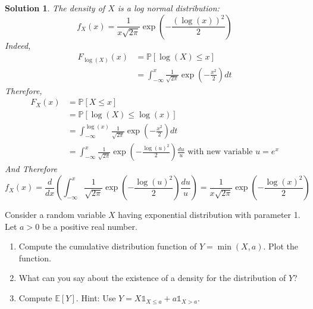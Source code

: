 \documentclass{article}
\newcommand{\proba}[1]{\mathbb{P}[#1]}
\newtheorem{solution}{Solution}
\begin{document}
\begin{solution}
  The density of $X$ is a log normal distribution:
  \[
    f_{X}(x) = \frac{1}{x\sqrt{2\pi}} \exp{\left( -\frac{{(\log(x))}^2}{2} \right)}
  \]
  Indeed,
  \begin{align*}
    F_{\log(X)}(x) & = \proba{\log(X) \leq x}                                                        \\
                   & = \int_{-\infty}^x \frac{1}{\sqrt{2\pi}} \exp{\left( -\frac{x^2}{2} \right)} dt
  \end{align*}
  Therefore,
  \begin{align*}
    F_{X}(x) & = \proba{X \leq x}                                                                                                                     \\
             & = \proba{\log(X) \leq \log(x)}                                                                                                         \\
             & = \int_{-\infty}^{\log(x)} \frac{1}{\sqrt{2\pi}} \exp{\left( -\frac{x^2}{2} \right)} dt                                                \\
             & = \int_{-\infty}^{x} \frac{1}{\sqrt{2\pi}} \exp{\left( -\frac{{\log(u)}^2}{2} \right)} \frac{du}{u} \text{ with new variable } u = e^x
  \end{align*}
  And Therefore
  \[
    f_X(x) = \frac{d}{dx} \left( \int_{-\infty}^{x} \frac{1}{\sqrt{2\pi}} \exp{\left( -\frac{{\log(u)}^2}{2} \right)} \frac{du}{u} \right) = \frac{1}{x\sqrt{2\pi}} \exp{\left( -\frac{{\log(x)}^2}{2} \right)}
  \]
\end{solution}

\begin{Exercise}
  Consider a random variable $X$ having exponential distribution with parameter 1. Let $a>0$ be a positive real number.
  \begin{enumerate}
    \item Compute the cumulative distribution function of $Y=\min (X, a)$. Plot the
          function.

    \item What can you say about the existence of a density for the distribution of $Y$?

    \item Compute $\mathbb{E}[Y]$. Hint: Use $Y=X \mathbb{1}_{X \leq a}+a
            \mathbb{1}_{X>a}$.
  \end{enumerate}
\end{Exercise}
\end{document}
